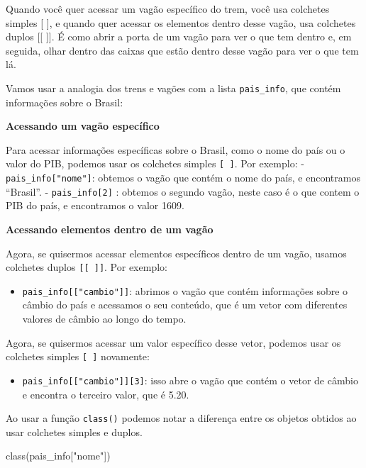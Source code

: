 \documentclass[
  portuguese,
  letterpaper,
  DIV=11,
  numbers=noendperiod]{scrreprt}
\newenvironment{Shaded}{\begin{snugshade}}{\end{snugshade}}
\newcommand{\FunctionTok}[1]{\textcolor[rgb]{0.28,0.35,0.67}{#1}}
\newcommand{\NormalTok}[1]{\textcolor[rgb]{0.00,0.23,0.31}{#1}}
\newcommand{\StringTok}[1]{\textcolor[rgb]{0.13,0.47,0.30}{#1}}
\providecommand{\tightlist}{%
  \setlength{\itemsep}{0pt}\setlength{\parskip}{0pt}}
\theoremstyle{definition}
\theoremstyle{remark}
\begin{document}
Quando você quer acessar um vagão específico do trem, você usa colchetes
simples {[} {]}, e quando quer acessar os elementos dentro desse vagão,
usa colchetes duplos {[}{[} {]}{]}. É como abrir a porta de um vagão
para ver o que tem dentro e, em seguida, olhar dentro das caixas que
estão dentro desse vagão para ver o que tem lá.

Vamos usar a analogia dos trens e vagões com a lista
\texttt{pais\_info}, que contém informações sobre o Brasil:

\textbf{Acessando um vagão específico}

Para acessar informações específicas sobre o Brasil, como o nome do país
ou o valor do PIB, podemos usar os colchetes simples \texttt{{[}\ {]}}.
Por exemplo: - \texttt{pais\_info{[}"nome"{]}}: obtemos o vagão que
contém o nome do país, e encontramos ``Brasil''. -
\texttt{pais\_info{[}2{]}} : obtemos o segundo vagão, neste caso é o que
contem o PIB do país, e encontramos o valor 1609.

\textbf{Acessando elementos dentro de um vagão}

Agora, se quisermos acessar elementos específicos dentro de um vagão,
usamos colchetes duplos \texttt{{[}{[}\ {]}{]}}. Por exemplo:

\begin{itemize}
\tightlist
\item
  \texttt{pais\_info{[}{[}"cambio"{]}{]}}: abrimos o vagão que contém
  informações sobre o câmbio do país e acessamos o seu conteúdo, que é
  um vetor com diferentes valores de câmbio ao longo do tempo.
\end{itemize}

Agora, se quisermos acessar um valor específico desse vetor, podemos
usar os colchetes simples \texttt{{[}\ {]}} novamente:

\begin{itemize}
\tightlist
\item
  \texttt{pais\_info{[}{[}"cambio"{]}{]}{[}3{]}}: isso abre o vagão que
  contém o vetor de câmbio e encontra o terceiro valor, que é 5.20.
\end{itemize}

Ao usar a função \texttt{class()} podemos notar a diferença entre os
objetos obtidos ao usar colchetes simples e duplos.

\begin{Shaded}
\begin{Highlighting}[]
\FunctionTok{class}\NormalTok{(pais\_info[}\StringTok{"nome"}\NormalTok{])}
\end{Highlighting}
\end{Shaded}
\end{document}
